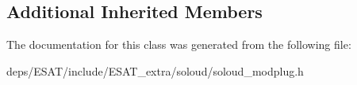 \subsection*{Additional Inherited Members}


The documentation for this class was generated from the following file\+:\begin{DoxyCompactItemize}
\item 
deps/\+E\+S\+A\+T/include/\+E\+S\+A\+T\+\_\+extra/soloud/soloud\+\_\+modplug.\+h\end{DoxyCompactItemize}

